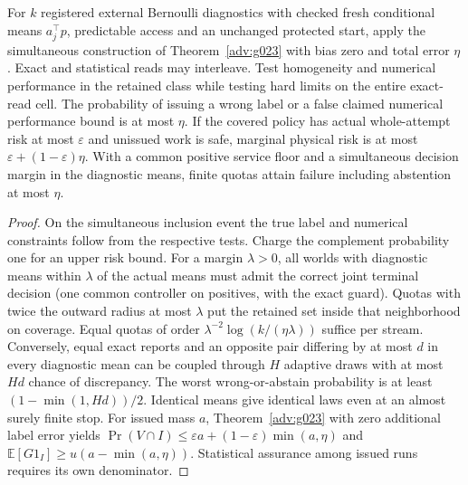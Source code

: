 \begin{theorem}\label{flag:p3}
For \(k\) registered external Bernoulli diagnostics with checked fresh conditional means \(a_j^\top p\), predictable access and an unchanged protected start, apply the simultaneous construction of Theorem~\ref{adv:g023} with bias zero and total error \(\eta\). Exact and statistical reads may interleave. Test homogeneity and numerical performance in the retained class while testing hard limits on the entire exact-read cell. The probability of issuing a wrong label or a false claimed numerical performance bound is at most \(\eta\). If the covered policy has actual whole-attempt risk at most \(\varepsilon\) and unissued work is safe, marginal physical risk is at most \(\varepsilon+(1-\varepsilon)\eta\). With a common positive service floor and a simultaneous decision margin in the diagnostic means, finite quotas attain failure including abstention at most \(\eta\).
\end{theorem}
\begin{proof}
On the simultaneous inclusion event the true label and numerical constraints follow from the respective tests. Charge the complement probability one for an upper risk bound. For a margin \(\lambda>0\), all worlds with diagnostic means within \(\lambda\) of the actual means must admit the correct joint terminal decision (one common controller on positives, with the exact guard). Quotas with twice the outward radius at most \(\lambda\) put the retained set inside that neighborhood on coverage. Equal quotas of order \(\lambda^{-2}\log(k/(\eta\lambda))\) suffice per stream. Conversely, equal exact reports and an opposite pair differing by at most \(d\) in every diagnostic mean can be coupled through \(H\) adaptive draws with at most \(Hd\) chance of discrepancy. The worst wrong-or-abstain probability is at least \((1-\min(1,Hd))/2\). Identical means give identical laws even at an almost surely finite stop. For issued mass \(a\), Theorem~\ref{adv:g023} with zero additional label error yields \(\Pr(V\cap I)\le\varepsilon a+(1-\varepsilon)\min(a,\eta)\) and \(\mathbb E[G1_I]\ge u(a-\min(a,\eta))\). Statistical assurance among issued runs requires its own denominator.
\end{proof}

